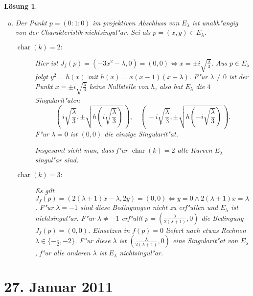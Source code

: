 \documentclass[a4paper, 12pt, numbers=noendperiod, chapterprefix=true, headsepline]{scrbook}
\theoremstyle{break}
\newtheorem{Loes}{L\"osung}
\theoremstyle{nonumberbreak}
\theoremstyle{nonumberplain}
\newcommand{\pder}[2][]{\frac{\partial #1}{\partial #2}}  %
\DeclareMathOperator{\chara}{char}
\begin{document}
\begin{Loes}
\begin{enumerate}[a)]
\begin{eqnarray*}
		\left(\pder{X}{F}\right)(p) &=& (-3X^2 + 2 (\lambda+1) XZ - \lambda Z^2)(p) = 0 \\
		\left(\pder{Y}{F}\right)(p) &=&  (2YZ)(p) = 0\\
		\left(\pder{Z}{F}\right)(p) &=& (Y^2+(\lambda+1)X^2-2 \lambda XZ)(p) = 1 \neq 0
	\end{eqnarray*}
	Somit ist $p$ f"ur alle $\lambda \in k$ nichtsingul"ar und $\overline{E_\lambda}$ hat genau die Singularit"aten von $E_\lambda$.
\item
	Der Punkt $p=(0:1:0)$ im projektiven Abschluss von $E_\lambda$ ist unabh"angig von der Charakteristik nichtsingul"ar. Sei als $p =(x,y) \in E_\lambda$.
	\begin{description}
	\item[$\chara(k)=2:$]
		Hier ist $J_f(p) = (-3x^2-\lambda, 0) = (0,0) \Leftrightarrow x = \pm i \sqrt{\frac{\lambda}{3}}$. Aus $p \in E_\lambda$ folgt $y^2= h(x)$ mit $h(x) = x(x-1)(x-\lambda)$. F"ur $\lambda \neq 0$ ist der Punkt $x= \pm i \sqrt{\frac{\lambda}{3}}$ keine Nullstelle von $h$, also hat $E_\lambda$ die $4$ Singularit"aten
			\[\left(\, i\sqrt{\frac{\lambda}{3}} , \pm \sqrt{h\left( i \sqrt{\frac{\lambda}{3}} \right)}\,\right), \quad 
			\left(\,-i\sqrt{\frac{\lambda}{3}}, \pm \sqrt{h\left(- i \sqrt{\frac{\lambda}{3}}\right)} \,\right).\]
		F"ur $\lambda = 0$ ist $(0,0)$ die einzige Singularit"at.

		Insgesamt sieht man, dass f"ur $\chara(k) = 2$ alle Kurven $E_\lambda$ singul"ar sind.
	\item[$\chara(k)=3:$]
		Es gilt $J_f(p) = (2(\lambda+1) x - \lambda , 2y) = (0,0) \Leftrightarrow y = 0 \wedge 2 (\lambda+1)x = \lambda$. F"ur $\lambda = -1$ sind diese Bedingungen nicht zu erf"ullen und $E_\lambda$ ist nichtsingul"ar. F"ur $\lambda \neq -1$ erf"ullt $p = ( \frac{\lambda}{2(\lambda+1)},0)$ die Bedingung $J_f(p)=(0,0)$. Einsetzen in $f(p) = 0$ liefert nach etwas Rechnen $\lambda \in \{ -\frac{1}{2},-2\}$. F"ur diese $\lambda$ ist $( \frac{\lambda}{2(\lambda+1)},0)$ eine Singularit"at von $E_\lambda$, f"ur alle anderen $\lambda$ ist $E_\lambda$ nichtsingul"ar.
	\end{description}
\end{enumerate}\end{Loes}

\newpage
\section{27. Januar 2011}
\setcounter{Aufg}{0}
\setcounter{Loes}{0}
\end{document}
